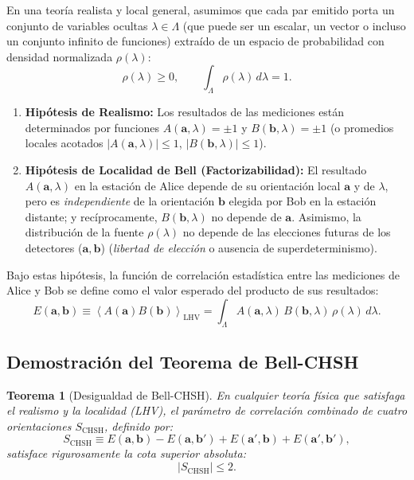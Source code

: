 \documentclass[11pt,a4paper,twoside]{report}
\theoremstyle{definition}
\theoremstyle{plain}
\newtheorem{teorema}{Teorema}[chapter]
\theoremstyle{remark}
\newcommand{\expval}[1]{\left\langle #1 \right\rangle}
\begin{document}
En una teoría realista y local general, asumimos que cada par emitido porta un conjunto de variables ocultas $\lambda \in \Lambda$ (que puede ser un escalar, un vector o incluso un conjunto infinito de funciones) extraído de un espacio de probabilidad con densidad normalizada $\rho(\lambda)$:
\begin{equation}
    \rho(\lambda) \ge 0, \qquad \int_{\Lambda} \rho(\lambda)\,d\lambda = 1.
\end{equation}
\begin{enumerate}
    \item \textbf{Hipótesis de Realismo:} Los resultados de las mediciones están determinados por funciones $A(\bm{a}, \lambda) = \pm 1$ y $B(\bm{b}, \lambda) = \pm 1$ (o promedios locales acotados $|A(\bm{a},\lambda)| \le 1$, $|B(\bm{b},\lambda)| \le 1$).
    \item \textbf{Hipótesis de Localidad de Bell (Factorizabilidad):} El resultado $A(\bm{a}, \lambda)$ en la estación de Alice depende de su orientación local $\bm{a}$ y de $\lambda$, pero es \emph{independiente} de la orientación $\bm{b}$ elegida por Bob en la estación distante; y recíprocamente, $B(\bm{b}, \lambda)$ no depende de $\bm{a}$. Asimismo, la distribución de la fuente $\rho(\lambda)$ no depende de las elecciones futuras de los detectores ($\bm{a}, \bm{b}$) (\textit{libertad de elección} o ausencia de superdeterminismo).
\end{enumerate}

Bajo estas hipótesis, la función de correlación estadística entre las mediciones de Alice y Bob se define como el valor esperado del producto de sus resultados:
\begin{equation}
    E(\bm{a}, \bm{b}) \equiv \expval{A(\bm{a})B(\bm{b})}_{\text{LHV}} = \int_{\Lambda} A(\bm{a}, \lambda)\, B(\bm{b}, \lambda)\, \rho(\lambda)\, d\lambda.
\end{equation}

\subsection{Demostración del Teorema de Bell-CHSH}

\begin{teorema}[Desigualdad de Bell-CHSH]
En cualquier teoría física que satisfaga el realismo y la localidad (LHV), el parámetro de correlación combinado de cuatro orientaciones $S_{\text{CHSH}}$, definido por:
\begin{equation}
    S_{\text{CHSH}} \equiv E(\bm{a}, \bm{b}) - E(\bm{a}, \bm{b}') + E(\bm{a}', \bm{b}) + E(\bm{a}', \bm{b}'),
\end{equation}
satisface rigurosamente la cota superior absoluta:
\begin{equation}
    |S_{\text{CHSH}}| \le 2.
\end{equation}
\end{teorema}
\end{document}
